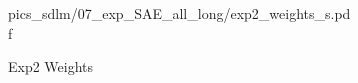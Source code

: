 \begin{figure}
\begin{subfigure}[c]{0.45\textwidth}
{			{pics_sdlm/07_exp_SAE_all_long/exp2_weights_s.pdf}}
		\caption{Exp2 Weights}
	\end{subfigure}%
	\hspace{1em}
	\begin{subfigure}[c]{0.45\textwidth}\raggedleft
		\\
		\\
\end{subfigure}
\end{figure}

